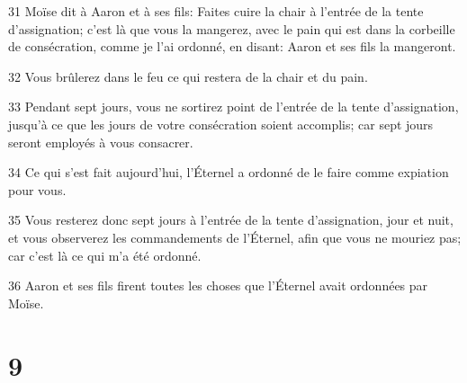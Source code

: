 \par 31 Moïse dit à Aaron et à ses fils: Faites cuire la chair à l'entrée de la tente d'assignation; c'est là que vous la mangerez, avec le pain qui est dans la corbeille de consécration, comme je l'ai ordonné, en disant: Aaron et ses fils la mangeront.
\par 32 Vous brûlerez dans le feu ce qui restera de la chair et du pain.
\par 33 Pendant sept jours, vous ne sortirez point de l'entrée de la tente d'assignation, jusqu'à ce que les jours de votre consécration soient accomplis; car sept jours seront employés à vous consacrer.
\par 34 Ce qui s'est fait aujourd'hui, l'Éternel a ordonné de le faire comme expiation pour vous.
\par 35 Vous resterez donc sept jours à l'entrée de la tente d'assignation, jour et nuit, et vous observerez les commandements de l'Éternel, afin que vous ne mouriez pas; car c'est là ce qui m'a été ordonné.
\par 36 Aaron et ses fils firent toutes les choses que l'Éternel avait ordonnées par Moïse.

\chapter{9}

